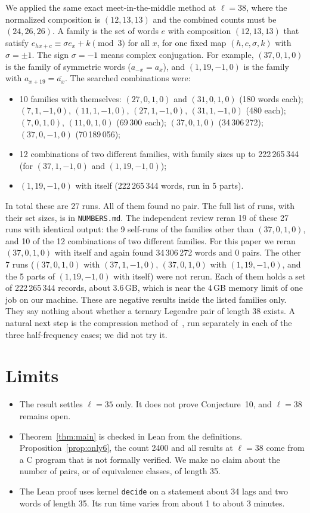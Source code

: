 \documentclass[11pt]{article}
\theoremstyle{remark}
\begin{document}
We applied the same exact meet-in-the-middle method at $\ell = 38$, where the normalized composition is $(12, 13, 13)$ and the combined counts must be $(24, 26, 26)$. A family is the set of words $e$ with composition $(12, 13, 13)$ that satisfy $e_{hx + c} \equiv \sigma e_x + k \pmod 3$ for all $x$, for one fixed map $(h, c, \sigma, k)$ with $\sigma = \pm 1$. The sign $\sigma = -1$ means complex conjugation. For example, $(37, 0, 1, 0)$ is the family of symmetric words ($a_{-x} = a_x$), and $(1, 19, -1, 0)$ is the family with $a_{x+19} = \overline{a_x}$. The searched combinations were:
\begin{itemize}
  \item 10 families with themselves: $(27,0,1,0)$ and $(31,0,1,0)$ (180 words each); $(7,1,-1,0)$, $(11,1,-1,0)$, $(27,1,-1,0)$, $(31,1,-1,0)$ (480 each); $(7,0,1,0)$, $(11,0,1,0)$ (69\,300 each); $(37,0,1,0)$ (34\,306\,272); $(37,0,-1,0)$ (70\,189\,056);
  \item 12 combinations of two different families, with family sizes up to 222\,265\,344 (for $(37,1,-1,0)$ and $(1,19,-1,0)$);
  \item $(1,19,-1,0)$ with itself (222\,265\,344 words, run in 5 parts).
\end{itemize}
In total these are 27 runs. All of them found no pair. The full list of runs, with their set sizes, is in \texttt{NUMBERS.md}. The independent review reran 19 of these 27 runs with identical output: the 9 self-runs of the families other than $(37,0,1,0)$, and 10 of the 12 combinations of two different families. For this paper we reran $(37,0,1,0)$ with itself and again found 34\,306\,272 words and 0 pairs. The other 7 runs ($(37,0,1,0)$ with $(37,1,-1,0)$, $(37,0,1,0)$ with $(1,19,-1,0)$, and the 5 parts of $(1,19,-1,0)$ with itself) were not rerun. Each of them holds a set of 222\,265\,344 records, about 3.6\,GB, which is near the 4\,GB memory limit of one job on our machine. These are negative results inside the listed families only. They say nothing about whether a ternary Legendre pair of length 38 exists. A natural next step is the compression method of~\cite{KLW}, run separately in each of the three half-frequency cases; we did not try it.

\section{Limits}
\begin{itemize}
  \item The result settles $\ell = 35$ only. It does not prove Conjecture~10, and $\ell = 38$ remains open.
  \item Theorem~\ref{thm:main} is checked in Lean from the definitions. Proposition~\ref{prop:only6}, the count 2400 and all results at $\ell = 38$ come from a C program that is not formally verified. We make no claim about the number of pairs, or of equivalence classes, of length 35.
  \item The Lean proof uses kernel \texttt{decide} on a statement about 34 lags and two words of length 35. Its run time varies from about 1 to about 3 minutes.
\end{itemize}
\end{document}
